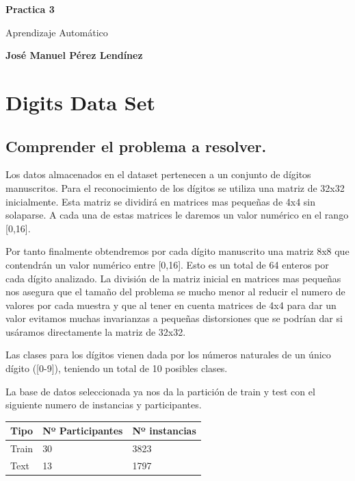 \documentclass[titlepage]{article}
\begin{document}
	\begin{titlepage}
		\begin{center}
			\vspace*{1cm}
			\date{} %
			\Huge
			\textbf{Practica 3}
			
			\vspace{0.5cm}
			\LARGE
			Aprendizaje Automático
			
			\vspace{1.5cm}
			
			\textbf{José Manuel Pérez Lendínez}
			

			
		\end{center}
	\newpage
	\tableofcontents
	\newpage
	\end{titlepage}

	\section{Digits Data Set}	
	\subsection{Comprender el problema a resolver.}
	Los datos almacenados en el dataset pertenecen a un conjunto de dígitos manuscritos. 
	Para el reconocimiento de los dígitos se utiliza una matriz de 32x32 inicialmente. Esta matriz se dividirá en matrices mas pequeñas de 4x4 sin solaparse. A cada una de estas matrices le daremos un valor numérico en el rango [0,16].
	
	 Por tanto finalmente obtendremos por cada dígito manuscrito una matriz 8x8 que contendrán un valor numérico entre [0,16]. Esto es un total de 64 enteros por cada dígito analizado. La división de la matriz inicial en matrices mas pequeñas nos asegura que el tamaño del problema se mucho menor al reducir el numero de valores por cada muestra y que al tener en cuenta matrices de 4x4 para dar un valor evitamos muchas invarianzas a pequeñas distorsiones que se podrían dar si usáramos directamente la matriz de 32x32. 
	
	Las clases para los dígitos vienen dada por los números naturales de un único dígito ([0-9]), teniendo un total de 10 posibles clases.
	
	La base de datos seleccionada ya nos da la partición de train y test con el siguiente numero de instancias y participantes.
	
	\begin{table}[htbp]
		\begin{center}
			\begin{tabular}{|l|l|l|}
				\hline
				Tipo & Nº Participantes & Nº instancias \\
				\hline
				Train & 30 & 3823\\ \hline
				Text & 13 & 1797\\
				 \hline
			\end{tabular}
		\end{center}
	\end{table}
\end{document}
